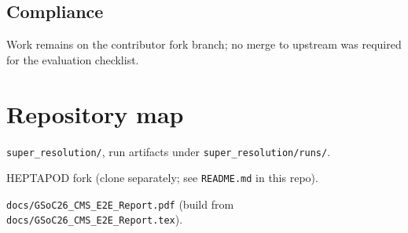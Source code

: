 \documentclass[11pt,a4paper]{article}
\begin{document}
\subsection{Compliance}
Work remains on the contributor fork branch; no merge to upstream was required for the evaluation checklist.

\section*{Repository map}
\begin{description}[style=unboxed,leftmargin=0cm]
  \item[Task 2b:] \texttt{super\_resolution/}, run artifacts under \texttt{super\_resolution/runs/}.
  \item[Task 2c:] HEPTAPOD fork (clone separately; see \texttt{README.md} in this repo).
  \item[This PDF:] \texttt{docs/GSoC26\_CMS\_E2E\_Report.pdf} (build from \texttt{docs/GSoC26\_CMS\_E2E\_Report.tex}).
\end{description}
\end{document}
